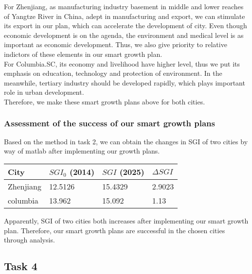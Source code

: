 \documentclass{mcmthesis}
\begin{document}
\noindent For Zhenjiang, as manufacturing industry basement in middle and lower reaches of Yangtze River in China, adept in manufacturing and export, we can stimulate its export in our plan, which can accelerate the development of city. Even though economic development is on the agenda, the environment and medical level is as important as economic development. Thus, we also give priority to relative indictors of these elements in our smart growth plan. \\
For Columbia.SC, its economy and livelihood have higher level, thus we put its emphasis on education, technology and protection of environment. In the meanwhile, tertiary industry should be developed rapidly, which plays important role in urban development. \\
\noindent Therefore, we make these smart growth plans above for both cities. \\
\subsubsection{Assessment of the success of our smart growth plans}%
Based on the method in task 2, we can obtain the changes in SGI of two cities by way of matlab after implementing our growth plans.\\
\begin{table}[h]
\setlength{\abovecaptionskip}{0pt}
\setlength{\belowcaptionskip}{0pt}
\begin{tabular}{p{3cm}|p{3cm}|p{3cm}|p{3cm}}
\hline
City	& $SGI_0$ (2014)	& $SGI$ (2025)	& $\Delta SGI$ \\
\hline
Zhenjiang	& 12.5126	& 15.4329	& 2.9023 \\
columbia	& 13.962	& 15.092	& 1.13\\
\hline
\end{tabular}
\end{table}

\noindent Apparently, SGI of two cities both increases after implementing our smart growth plan. Therefore, our smart growth plans are successful in the chosen cities through analysis.\\
\subsection{Task 4}%
\end{document}
